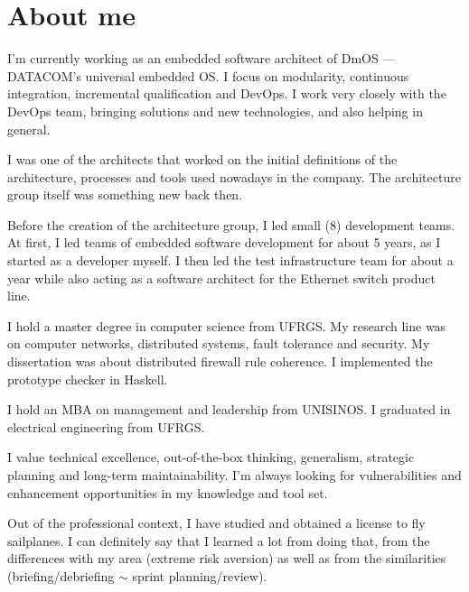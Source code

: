 \documentclass[11pt,a4paper,sans]{moderncv}
\begin{document}
\makecvtitle

\section{About me}

I'm currently working as an embedded software architect of DmOS ---
DATACOM's universal embedded OS. I focus on modularity, continuous
integration, incremental qualification and DevOps. I work very closely
with the DevOps team, bringing solutions and new technologies, and also
helping in general.

\vspace{1em}
I was one of the architects that worked on the initial definitions of
the architecture, processes and tools used nowadays in the company. The
architecture group itself was something new back then.

\vspace{1em}
Before the creation of the architecture group, I led small (8)
development teams. At first, I led teams of embedded software
development for about 5 years, as I started as a developer myself. I
then led the test infrastructure team for about a year while also acting
as a software architect for the Ethernet switch product line.

\vspace{1em}
I hold a master degree in computer science from UFRGS. My research line
was on computer networks, distributed systems, fault tolerance and
security. My dissertation was about distributed firewall rule coherence.
I implemented the prototype checker in Haskell.

\vspace{1em}
I hold an MBA on management and leadership from UNISINOS. I graduated in
electrical engineering from UFRGS.

\vspace{1em}
I value technical excellence, out-of-the-box thinking, generalism,
strategic planning and long-term maintainability. I'm always looking for
vulnerabilities and enhancement opportunities in my knowledge and tool
set.

\vspace{1em}
Out of the professional context, I have studied and obtained a license
to fly sailplanes. I can definitely say that I learned a lot from doing
that, from the differences with my area (extreme risk aversion) as well
as from the similarities (briefing/debriefing \(\sim\) sprint
planning/review).


\clearpage
\end{document}
